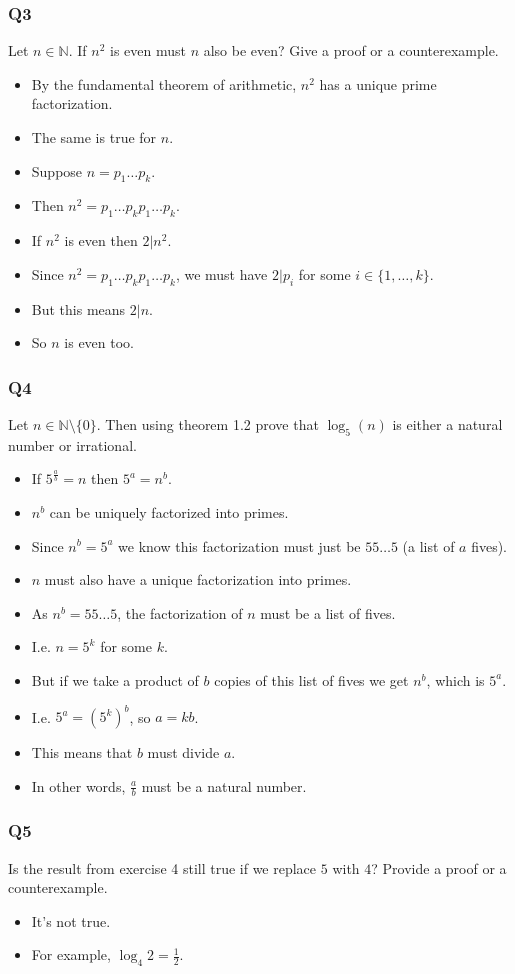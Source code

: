 \documentclass[handout]{beamer}
\newcommand{\bN}{\mathbb{N}}
\begin{document}
\begin{frame}
\frametitle{Q3}
Let $n\in\bN$. If $n^2$ is even must $n$ also be even? Give a proof or a counterexample.
\vspace{0.5cm}
\begin{itemize}
\item By the fundamental theorem of arithmetic, $n^2$ has a unique prime factorization.
 \item The same is true for $n$. 
\item Suppose $n = p_1\ldots p_k$. 
\item Then $n^2=p_1\ldots p_kp_1\ldots p_k$. 
\item If $n^2$ is even then $2| n^2$. 
\item Since $n^2 = p_1\ldots p_kp_1\ldots p_k$, we must have $2| p_i$ for some $i\in \{1,\ldots,k\}$.
\item But this means $2|n$. 
\item So $n$ is even too.
\end{itemize}
\end{frame}

\begin{frame}
\frametitle{Q4}
Let $n\in\bN\setminus\{0\}$. Then using theorem 1.2 prove that $\log_5(n)$ is either a natural number or irrational.
\begin{itemize}
\item If $5^{\frac{a}{b}} = n$ then $5^a = n^b$. 
\item $n^b$ can be uniquely factorized into primes. 
\item Since $n^b = 5^a$ we know this factorization must just be $55\ldots 5$ (a list of $a$ fives). 
\item $n$ must also have a unique factorization into primes. 
\item As $n^b = 55\ldots 5$, the factorization of $n$ must be a list of fives.
\item I.e. $n = 5^k$ for some $k$.
\item  But if we take a product of $b$ copies of this list of fives we get $n^b$, which is $5^a$.
\item I.e. $5^a = (5^k)^b$, so $a = kb$. 
\item This means that $b$ must divide $a$. 
\item In other words, $\frac{a}{b}$ must be a natural number.  
\end{itemize}
\end{frame}

\begin{frame}
\frametitle{Q5}
Is the result from exercise 4 still true if we replace $5$ with $4$? Provide a proof or a counterexample.
\vspace{1cm}
\begin{itemize}
\item It's not true. 
\vspace{0.5cm}
\item For example, $\log_4{2} = \frac{1}{2}$.
\end{itemize}
\end{frame}
\end{document}
